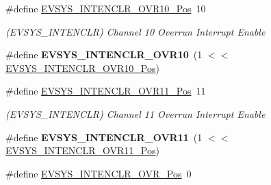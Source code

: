 \begin{DoxyCompactItemize}
\item 
\hypertarget{group___s_a_m_l21___e_v_s_y_s_ga492a00c2e4600dc0610216b304178769}{}\#define \hyperlink{group___s_a_m_l21___e_v_s_y_s_ga492a00c2e4600dc0610216b304178769}{E\+V\+S\+Y\+S\+\_\+\+I\+N\+T\+E\+N\+C\+L\+R\+\_\+\+O\+V\+R10\+\_\+\+Pos}~10\label{group___s_a_m_l21___e_v_s_y_s_ga492a00c2e4600dc0610216b304178769}

\begin{DoxyCompactList}\small\item\em (E\+V\+S\+Y\+S\+\_\+\+I\+N\+T\+E\+N\+C\+L\+R) Channel 10 Overrun Interrupt Enable \end{DoxyCompactList}\item 
\hypertarget{group___s_a_m_l21___e_v_s_y_s_gaed9b8b7de5e2c17691b20dd871689fd3}{}\#define {\bfseries E\+V\+S\+Y\+S\+\_\+\+I\+N\+T\+E\+N\+C\+L\+R\+\_\+\+O\+V\+R10}~(1 $<$$<$ \hyperlink{group___s_a_m_l21___e_v_s_y_s_ga492a00c2e4600dc0610216b304178769}{E\+V\+S\+Y\+S\+\_\+\+I\+N\+T\+E\+N\+C\+L\+R\+\_\+\+O\+V\+R10\+\_\+\+Pos})\label{group___s_a_m_l21___e_v_s_y_s_gaed9b8b7de5e2c17691b20dd871689fd3}

\item 
\hypertarget{group___s_a_m_l21___e_v_s_y_s_gae4d678aec0a54c1830bd2005ff082848}{}\#define \hyperlink{group___s_a_m_l21___e_v_s_y_s_gae4d678aec0a54c1830bd2005ff082848}{E\+V\+S\+Y\+S\+\_\+\+I\+N\+T\+E\+N\+C\+L\+R\+\_\+\+O\+V\+R11\+\_\+\+Pos}~11\label{group___s_a_m_l21___e_v_s_y_s_gae4d678aec0a54c1830bd2005ff082848}

\begin{DoxyCompactList}\small\item\em (E\+V\+S\+Y\+S\+\_\+\+I\+N\+T\+E\+N\+C\+L\+R) Channel 11 Overrun Interrupt Enable \end{DoxyCompactList}\item 
\hypertarget{group___s_a_m_l21___e_v_s_y_s_gacfa7909a15551e433f7f2cbff5e6ac85}{}\#define {\bfseries E\+V\+S\+Y\+S\+\_\+\+I\+N\+T\+E\+N\+C\+L\+R\+\_\+\+O\+V\+R11}~(1 $<$$<$ \hyperlink{group___s_a_m_l21___e_v_s_y_s_gae4d678aec0a54c1830bd2005ff082848}{E\+V\+S\+Y\+S\+\_\+\+I\+N\+T\+E\+N\+C\+L\+R\+\_\+\+O\+V\+R11\+\_\+\+Pos})\label{group___s_a_m_l21___e_v_s_y_s_gacfa7909a15551e433f7f2cbff5e6ac85}

\item 
\hypertarget{group___s_a_m_l21___e_v_s_y_s_gafee2a545114cf715716165d6590ac9cc}{}\#define \hyperlink{group___s_a_m_l21___e_v_s_y_s_gafee2a545114cf715716165d6590ac9cc}{E\+V\+S\+Y\+S\+\_\+\+I\+N\+T\+E\+N\+C\+L\+R\+\_\+\+O\+V\+R\+\_\+\+Pos}~0\label{group___s_a_m_l21___e_v_s_y_s_gafee2a545114cf715716165d6590ac9cc}


\end{DoxyCompactItemize}
